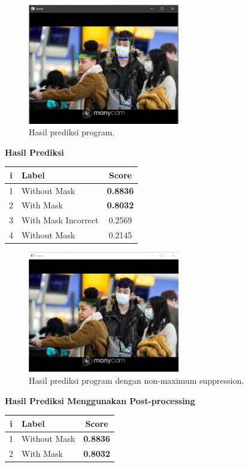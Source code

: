 \documentclass{article}
\begin{document}
	\begin{figure}[H]
		\centering
		\includegraphics[width=250px]{../demo/Results/implementation/raw_prediction_nms0_labeled.png}
		\caption{Hasil prediksi program.}
	\end{figure}
	{\large{\textbf{Hasil Prediksi}}}
	\begin{table}[H]
		\centering
		\begin{tabular}{clc}
		\hline
		\textbf{i} & \textbf{Label}               & \textbf{Score}  \\ \hline
		1 & Without Mask        & \textbf{0.8836} \\
		2 & With Mask           & \textbf{0.8032} \\
		3 & With Mask Incorrect & 0.2569 \\
		4 & Without Mask        & 0.2145
		\end{tabular}
	\end{table}
	\newpage
	
	\begin{figure}[H]
		\centering
		\includegraphics[width=250px]{../demo/Results/implementation/with_nms0.png}
		\caption{Hasil prediksi program dengan non-maximum suppression.}
  	\end{figure}
	{\large{\textbf{Hasil Prediksi Menggunakan Post-processing}}}
	\begin{table}[H]
		\centering
		\begin{tabular}{clc}
			\hline
			\textbf{i} & \textbf{Label}               & \textbf{Score}  \\ \hline
			1 & Without Mask        & \textbf{0.8836} \\
			2 & With Mask           & \textbf{0.8032} \\
		\end{tabular}
	\end{table}
\end{document}
